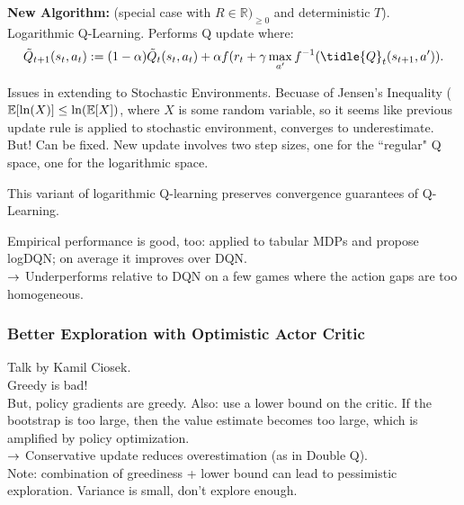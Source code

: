 {\bf New Algorithm:} (special case with $R \in \mathbb{R})_{\geq 0}$ and deterministic $T$). Logarithmic Q-Learning. Performs Q update where:
    \begin{equation}
        \tilde{Q}_{t+1}(s_t,a_t) := (1-\alpha)\tilde{Q}_t(s_t,a_t) + \alpha f(r_t + \gamma \max_{a'} f^{-1}(\tidle{Q}_t(s_{t+1}, a')).
    \end{equation}
    
Issues in extending to Stochastic Environments. Becuase of Jensen's Inequality ($\mathbb{E}[\ln(X)] \leq \ln(\mathbb{E}[X])$, where $X$ is some random variable, so it seems like previous update rule is applied to stochastic environment, converges to underestimate. \\

But! Can be fixed. New update involves two step sizes, one for the ``regular" Q space, one for the logarithmic space. 

\begin{theorem}
This variant of logarithmic Q-learning preserves convergence guarantees of Q-Learning.
\end{theorem}

Empirical performance is good, too: applied to tabular MDPs and propose logDQN; on average it improves over DQN. \\

$\rightarrow$ Underperforms relative to DQN on a few games where the action gaps are too homogeneous.


\subsubsection{Better Exploration with Optimistic Actor Critic}

Talk by Kamil Ciosek. \\

Greedy is bad! \\

But, policy gradients are greedy. Also: use a lower bound on the critic. If the bootstrap is too large, then the value estimate becomes too large, which is amplified by policy optimization. \\

$\rightarrow$ Conservative update reduces overestimation (as in Double Q). \\

Note: combination of greediness + lower bound can lead to pessimistic exploration. Variance is small, don't explore enough. \\

